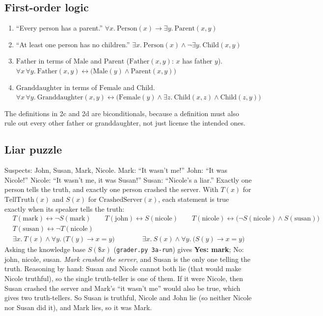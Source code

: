 \subsection{First-order logic}
\begin{enumerate}[label=(2\alph*)]
  \item ``Every person has a parent.'' \quad
        $\forall x.\ \text{Person}(x)\to\exists y.\ \text{Parent}(x,y)$
  \item ``At least one person has no children.'' \quad
        $\exists x.\ \text{Person}(x)\wedge\neg\exists y.\ \text{Child}(x,y)$
  \item $\text{Father}$ in terms of $\text{Male}$ and $\text{Parent}$ ($\text{Father}(x,y)$: $x$ has father $y$). \quad
        $\forall x\,\forall y.\ \text{Father}(x,y)\leftrightarrow\bigl(\text{Male}(y)\wedge\text{Parent}(x,y)\bigr)$
  \item $\text{Granddaughter}$ in terms of $\text{Female}$ and $\text{Child}$. \\
        $\forall x\,\forall y.\ \text{Granddaughter}(x,y)\leftrightarrow
         \bigl(\text{Female}(y)\wedge\exists z.\ \text{Child}(x,z)\wedge\text{Child}(z,y)\bigr)$
\end{enumerate}
The definitions in 2c and 2d are biconditionals, because a definition must also rule out every other father or
granddaughter, not just license the intended ones.

\subsection{Liar puzzle}
Suspects: John, Susan, Mark, Nicole. Mark: ``It wasn't me!'' John: ``It was Nicole!'' Nicole: ``It wasn't me, it
was Susan!'' Susan: ``Nicole's a liar.'' Exactly one person tells the truth, and exactly one person crashed the server.
With $T(x)$ for $\text{TellTruth}(x)$ and $S(x)$ for $\text{CrashedServer}(x)$, each statement is true exactly when its
speaker tells the truth:
\begin{align*}
&T(\text{mark})\leftrightarrow\neg S(\text{mark}) \qquad
 T(\text{john})\leftrightarrow S(\text{nicole}) \qquad
 T(\text{nicole})\leftrightarrow\bigl(\neg S(\text{nicole})\wedge S(\text{susan})\bigr)\\
&T(\text{susan})\leftrightarrow\neg T(\text{nicole}) \\
&\exists x.\ T(x)\wedge\forall y.\ \bigl(T(y)\to x=y\bigr) \qquad\qquad
 \exists x.\ S(x)\wedge\forall y.\ \bigl(S(y)\to x=y\bigr)
\end{align*}
Asking the knowledge base $S(\$x)$ (\texttt{grader.py 3a-run}) gives \textbf{Yes: mark}; No: john, nicole, susan.
\emph{Mark crashed the server}, and Susan is the only one telling the truth. Reasoning by hand: Susan and Nicole
cannot both lie (that would make Nicole truthful), so the single truth-teller is one of them. If it were Nicole,
then Susan crashed the server and Mark's ``it wasn't me'' would also be true, which gives two truth-tellers. So Susan
is truthful, Nicole and John lie (so neither Nicole nor Susan did it), and Mark lies, so it was Mark.

